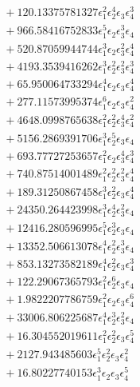\documentclass[10pt]{article}
\begin{document}
\begin{align*}
&{}  + 120.13375781327 \epsilon_{1}^{2} \epsilon_{2}^{4} \epsilon_{3} \epsilon_{4}^{3} \\
&{}  + 966.58416752833 \epsilon_{1}^{5} \epsilon_{2} \epsilon_{3}^{3} \epsilon_{4} \\
&{}  + 520.87059944744 \epsilon_{1}^{3} \epsilon_{2} \epsilon_{3}^{2} \epsilon_{4}^{4} \\
&{}  + 4193.3539416262 \epsilon_{1}^{3} \epsilon_{2}^{2} \epsilon_{3}^{2} \epsilon_{4}^{3} \\
&{}  + 65.950064733294 \epsilon_{1}^{4} \epsilon_{2} \epsilon_{3} \epsilon_{4}^{4} \\
&{}  + 277.11573995374 \epsilon_{1}^{6} \epsilon_{2} \epsilon_{3} \epsilon_{4}^{2} \\
&{}  + 4648.0998765638 \epsilon_{1}^{2} \epsilon_{2}^{2} \epsilon_{3}^{4} \epsilon_{4}^{2} \\
&{}  + 5156.2869391706 \epsilon_{1}^{3} \epsilon_{2}^{5} \epsilon_{3} \epsilon_{4} \\
&{}  + 693.77727253657 \epsilon_{1}^{2} \epsilon_{2} \epsilon_{3}^{4} \epsilon_{4}^{3} \\
&{}  + 740.87514001489 \epsilon_{1}^{2} \epsilon_{2}^{2} \epsilon_{3}^{2} \epsilon_{4}^{4} \\
&{}  + 189.31250867458 \epsilon_{1}^{3} \epsilon_{2}^{2} \epsilon_{3} \epsilon_{4}^{4} \\
&{}  + 24350.264423998 \epsilon_{1}^{3} \epsilon_{2}^{4} \epsilon_{3}^{2} \epsilon_{4} \\
&{}  + 12416.280596995 \epsilon_{1}^{5} \epsilon_{2}^{3} \epsilon_{3} \epsilon_{4} \\
&{}  + 13352.506613078 \epsilon_{1}^{4} \epsilon_{2}^{2} \epsilon_{3}^{3} \epsilon_{4} \\
&{}  + 853.13273582189 \epsilon_{1}^{4} \epsilon_{2}^{2} \epsilon_{3} \epsilon_{4}^{3} \\
&{}  + 122.29067365793 \epsilon_{1}^{2} \epsilon_{2}^{6} \epsilon_{3} \epsilon_{4} \\
&{}  + 1.9822207786759 \epsilon_{1}^{2} \epsilon_{2} \epsilon_{3} \epsilon_{4}^{6} \\
&{}  + 33006.806225687 \epsilon_{1}^{4} \epsilon_{2}^{3} \epsilon_{3}^{2} \epsilon_{4} \\
&{}  + 16.304552019611 \epsilon_{1}^{2} \epsilon_{2}^{2} \epsilon_{3} \epsilon_{4}^{5} \\
&{}  + 2127.943485603 \epsilon_{1}^{5} \epsilon_{2}^{2} \epsilon_{3} \epsilon_{4}^{2} \\
&{}  + 16.80227740153 \epsilon_{1}^{3} \epsilon_{2} \epsilon_{3} \epsilon_{4}^{5} \\

\end{align*}
\end{document}
